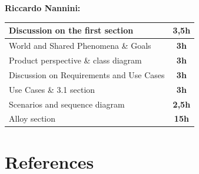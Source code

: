 \documentclass[]{article}
\begin{document}
	
	\textbf{\large \\ \\ Riccardo Nannini:} \\ \newline
		\begin{tabular}{|l|c|}
			\hline
			Discussion on the first section &  \textbf{3,5h} \\ \hline
			\rowcolor[HTML]{DCDCDC} 
			World and Shared Phenomena \& Goals & \textbf{3h} \\ \hline
			Product perspective \& class diagram & \textbf{3h} \\ \hline
			\rowcolor[HTML]{DCDCDC} 
			Discussion on Requirements and Use Cases & \textbf{3h} \\ \hline
			Use Cases \& 3.1 section & \textbf{3h} \\ \hline
			\rowcolor[HTML]{DCDCDC} 
			Scenarios and sequence diagram & \textbf{2,5h} \\ \hline
			Alloy section & \textbf{15h} \\ \hline
		\end{tabular}
	
	\section{References}	
				
\end{document}
